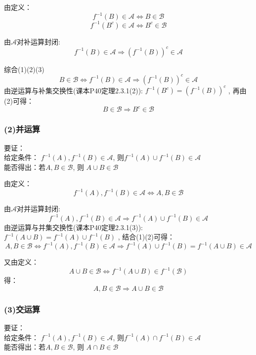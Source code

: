 \documentclass[10pt,a4paper]{article}
\begin{document}
由定义：
\[ 
f^{-1}(B)\in \mathscr{A} \iff  B\in\mathscr{B} 
\tag{1} 
\] 
\[ 
f^{-1}(B^c)\in \mathscr{A} \iff B^{c}\in\mathscr{B}
\tag{2} 
\] 

由$ \mathscr{A} $对补运算封闭:  
\[ 
f^{-1}(B)\in\mathscr{A} \Rightarrow {(f^{-1}(B))}^c\in\mathscr{A}  
\tag{3} 
\]

综合(1)(2)(3)
\[ 
B\in\mathscr{B} \iff f^{-1}(B)\in \mathscr{A}  \Rightarrow {(f^{-1}(B))}^c\in\mathscr{A}
\]
由逆运算与补集交换性(课本P40定理2.3.1(2)): $  f^{-1}(B^c)={(f^{-1}(B))}^c  $ , 再由(2)可得：
\[ 
B\in\mathscr{B}  \Rightarrow  B^{c}\in\mathscr{B}
\]

\subsubsection{(2)并运算}

\begin{shaded}
	要证：\\
	给定条件： $ f^{-1}(A),f^{-1}(B)\in\mathscr{A} $, 则$ f^{-1}(A) \cup f^{-1}(B) \in\mathscr{A} $ \\
	能否得出：若$ A,B\in \mathscr{B} $,  
	则 $ A \cup B \in \mathscr{B} $
	
	
\end{shaded}

由定义：
\[ 
f^{-1}(A),f^{-1}(B)\in\mathscr{A} \iff A,B\in \mathscr{B}
\tag{1} 
\] 


由$ \mathscr{A} $对并运算封闭:  
\[ 
f^{-1}(A),f^{-1}(B)\in\mathscr{A} \Rightarrow f^{-1}(A) \cup f^{-1}(B) \in\mathscr{A}
\tag{2} 
\]
由逆运算与并集交换性(课本P40定理2.3.1(3)): $  f^{-1}(A \cup B)=f^{-1}(A) \cup f^{-1}(B)  $ , 结合(1)(2)可得：
\[ 
A,B\in \mathscr{B} \iff f^{-1}(A),f^{-1}(B)\in\mathscr{A} \Rightarrow f^{-1}(A) \cup f^{-1}(B)=f^{-1}(A \cup B) \in\mathscr{A}
\]

又由定义：
\[ 
A \cup B \in\mathscr{B} \iff f^{-1}(A \cup B) \in f^{-1}(\mathscr{B})
\]
得： 
\[ 
A,B\in \mathscr{B}  \Rightarrow A \cup B \in \mathscr{B}
\]

\subsubsection{(3)交运算}

\begin{shaded}
	要证：\\
	给定条件： $ f^{-1}(A),f^{-1}(B)\in\mathscr{A} $, 则$ f^{-1}(A) \cap f^{-1}(B) \in\mathscr{A} $ \\
	能否得出：若$ A,B\in \mathscr{B} $,  
	则 $ A \cap B \in \mathscr{B} $
	
	
\end{shaded}
\end{document}
